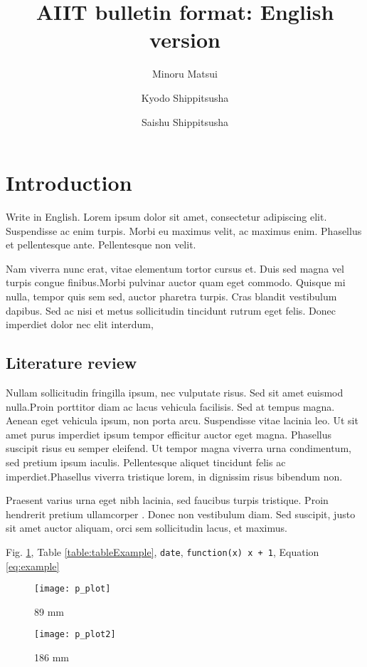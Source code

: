 \documentclass[a4paper, 9pt, twocolumn]{extarticle}
\title{AIIT bulletin format: English version \YEAR}
\author[1*]{Minoru Matsui}
\author[1,2]{Kyodo Shippitsusha}
\author[2,3]{Saishu Shippitsusha}
\affil[1]{Advanced Institute of Industrial Technology}
\affil[2]{Tokyo Metropolitan University}
\affil[3]{Tokyo Metropolitan College of Industrial Technology}
\affil[*]{Corresponding author: Minoru Matsui, xerroxcopy@gmail.com}
\begin{document}



\section{Introduction}

Write in English. Lorem ipsum dolor sit amet, consectetur adipiscing elit. Suspendisse ac enim turpis. Morbi eu maximus velit, ac maximus enim. Phasellus et pellentesque ante. Pellentesque non velit.

Nam viverra nunc erat, vitae elementum tortor cursus et. Duis sed magna vel turpis congue finibus.Morbi pulvinar auctor quam eget commodo. Quisque mi nulla, tempor quis sem sed, auctor pharetra turpis. Cras blandit vestibulum dapibus. Sed ac nisi et metus sollicitudin tincidunt rutrum eget felis. Donec imperdiet dolor nec elit interdum, 

\subsection*{Literature review}

Nullam sollicitudin fringilla ipsum, nec vulputate risus. Sed sit amet euismod nulla.Proin porttitor diam ac lacus vehicula facilisis. Sed at tempus magna. Aenean eget vehicula ipsum, non porta arcu. Suspendisse vitae lacinia leo. Ut sit amet purus imperdiet ipsum tempor efficitur auctor eget magna. Phasellus suscipit risus eu semper eleifend. Ut tempor magna viverra urna condimentum, sed pretium ipsum iaculis. Pellentesque aliquet tincidunt felis ac imperdiet.Phasellus viverra tristique lorem, in dignissim risus bibendum non. 

Praesent varius urna eget nibh lacinia, sed faucibus turpis tristique. Proin hendrerit pretium ullamcorper . Donec non vestibulum diam. Sed suscipit, justo sit amet auctor aliquam, orci sem sollicitudin lacus, et maximus\cite{Cooney2017-yt}.

Fig. \ref{figure:figureExample}, Table \ref{table:tableExample}, \verb|date|, \texttt{function(x) {x + 1}}, Equation \eqref{eq:example}
\begin{figure}[hbt!]
  \centering
\texttt{[image: p\_plot]}
    \caption{89 mm}
    \label{figure:figureExample}
\end{figure}
\begin{figure*}[hbt!]
  \centering
\texttt{[image: p\_plot2]}
    \caption{186 mm}
    \label{figure:figureExampleLarge}
\end{figure*}
\end{document}
